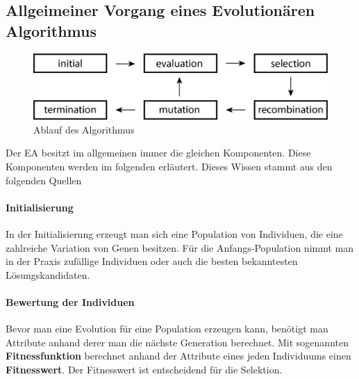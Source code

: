 \subsection{Allgeimeiner Vorgang eines Evolution{\"a}ren Algorithmus}
\begin{figure}
	\centering
    \includegraphics[width=\textwidth]{pics/algo.png}
    \caption{Ablauf des Algorithmus}
    \label{fig:ablaufalgo}
\end{figure}
Der EA besitzt im allgemeinen immer die gleichen Komponenten. Diese Komponenten werden im folgenden erl{\"a}utert. Dieses Wissen stammt aus den folgenden Quellen \cite{shiffman2012nature, flickevolutionare, weicker2015evolutionare}

\paragraph*{Initialisierung}
In der Initialisierung erzeugt man sich eine Population von Individuen, die eine zahlreiche Variation von Genen besitzen. F{\"u}r die Anfangs-Population nimmt man in der Praxis zuf{\"a}llige Individuen oder auch die besten bekanntesten L{\"o}sungskandidaten.

\paragraph*{Bewertung der Individuen}
Bevor man eine Evolution f{\"u}r eine Population erzeugen kann, ben{\"o}tigt man Attribute anhand derer man die n{\"a}chste Generation berechnet. Mit sogenannten \textbf{Fitnessfunktion} berechnet anhand der Attribute eines jeden Individuums einen \textbf{Fitnesswert}. Der Fitnesswert ist entscheidend f{\"u}r die Selektion.



